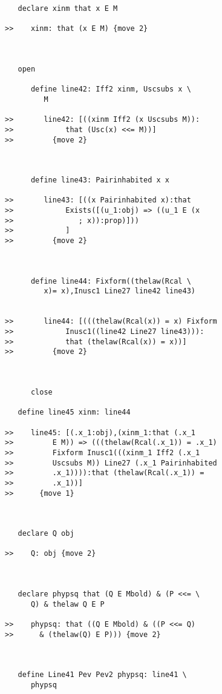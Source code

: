 \documentclass[12pt]{article}
\begin{document}
\begin{verbatim}
   declare xinm that x E M

>>    xinm: that (x E M) {move 2}



   open

      define line42: Iff2 xinm, Uscsubs x \
         M

>>       line42: [((xinm Iff2 (x Uscsubs M)):
>>            that (Usc(x) <<= M))]
>>         {move 2}



      define line43: Pairinhabited x x

>>       line43: [((x Pairinhabited x):that
>>            Exists([(u_1:obj) => ((u_1 E (x
>>               ; x)):prop)]))
>>            ]
>>         {move 2}



      define line44: Fixform((thelaw(Rcal \
         x)= x),Inusc1 Line27 line42 line43)


>>       line44: [(((thelaw(Rcal(x)) = x) Fixform
>>            Inusc1((line42 Line27 line43))):
>>            that (thelaw(Rcal(x)) = x))]
>>         {move 2}



      close

   define line45 xinm: line44

>>    line45: [(.x_1:obj),(xinm_1:that (.x_1
>>         E M)) => (((thelaw(Rcal(.x_1)) = .x_1)
>>         Fixform Inusc1(((xinm_1 Iff2 (.x_1
>>         Uscsubs M)) Line27 (.x_1 Pairinhabited
>>         .x_1)))):that (thelaw(Rcal(.x_1)) =
>>         .x_1))]
>>      {move 1}



   declare Q obj

>>    Q: obj {move 2}



   declare phypsq that (Q E Mbold) & (P <<= \
      Q) & thelaw Q E P

>>    phypsq: that ((Q E Mbold) & ((P <<= Q)
>>      & (thelaw(Q) E P))) {move 2}



   define Line41 Pev Pev2 phypsq: line41 \
      phypsq


\end{verbatim}
\end{document}
